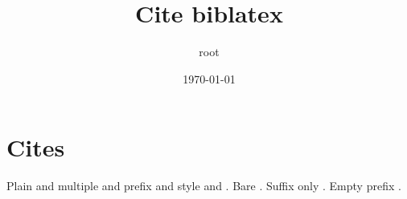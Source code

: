\documentclass[11pt]{article}
\author{root}
\date{\today}
\title{Cite biblatex}
\begin{document}
\maketitle
\tableofcontents

\section{Cites}
\label{sec:org7e97bcc}
Plain \autocite{doe99} and multiple \autocite{doe99,roe05} and prefix \autocite[see][p. 3]{doe99} and style \textcite{doe99} and \nocite{roe05}.
Bare \citeauthor{doe99}. Suffix only \autocite[, pp. 1-2]{doe99}. Empty prefix \autocites{doe99}[see][]{roe05}.

\printbibliography
\end{document}
